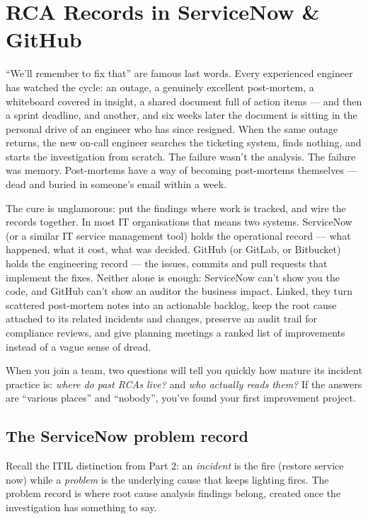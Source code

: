 \section{RCA Records in ServiceNow \& GitHub}
``We'll remember to fix that'' are famous last words. Every experienced engineer has watched the cycle: an outage, a genuinely excellent post-mortem, a whiteboard covered in insight, a shared document full of action items — and then a sprint deadline, and another, and six weeks later the document is sitting in the personal drive of an engineer who has since resigned. When the same outage returns, the new on-call engineer searches the ticketing system, finds nothing, and starts the investigation from scratch. The failure wasn't the analysis. The failure was memory. Post-mortems have a way of becoming post-mortems themselves — dead and buried in someone's email within a week.


The cure is unglamorous: put the findings where work is tracked, and wire the records together. In most IT organisations that means two systems. ServiceNow (or a similar IT service management tool) holds the operational record — what happened, what it cost, what was decided. GitHub (or GitLab, or Bitbucket) holds the engineering record — the issues, commits and pull requests that implement the fixes. Neither alone is enough: ServiceNow can't show you the code, and GitHub can't show an auditor the business impact. Linked, they turn scattered post-mortem notes into an actionable backlog, keep the root cause attached to its related incidents and changes, preserve an audit trail for compliance reviews, and give planning meetings a ranked list of improvements instead of a vague sense of dread.


When you join a team, two questions will tell you quickly how mature its incident practice is: \emph{where do past RCAs live?} and \emph{who actually reads them?} If the answers are ``various places'' and ``nobody'', you've found your first improvement project.



\subsection{The ServiceNow problem record}


Recall the ITIL distinction from Part 2: an \emph{incident} is the fire (restore service now) while a \emph{problem} is the underlying cause that keeps lighting fires. The problem record is where root cause analysis findings belong, created once the investigation has something to say.


